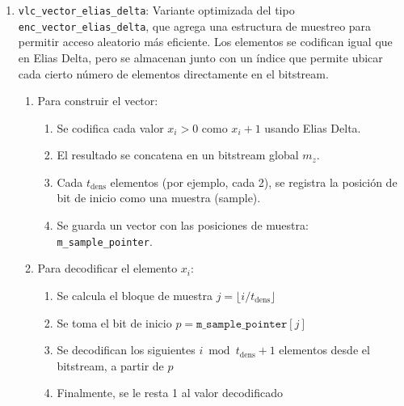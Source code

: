 \begin{enumerate}
        
  \item \texttt{vlc\_vector\_elias\_delta}:  
        Variante optimizada del tipo \texttt{enc\_vector\_elias\_delta}, que agrega una estructura de muestreo para permitir acceso aleatorio más eficiente. Los elementos se codifican igual que en Elias Delta, pero se almacenan junto con un índice que permite ubicar cada cierto número de elementos directamente en el bitstream.
    
        \begin{enumerate}
            \item Para construir el vector:
            \begin{enumerate}
                \item Se codifica cada valor \(x_i > 0\) como \(x_i + 1\) usando Elias Delta.
                \item El resultado se concatena en un bitstream global \(m_z\).
                \item Cada \(t_{\text{dens}}\) elementos (por ejemplo, cada 2), se registra la posición de bit de inicio como una muestra (sample).
                \item Se guarda un vector con las posiciones de muestra: \texttt{m\_sample\_pointer}.
            \end{enumerate}
    
            \item Para decodificar el elemento \(x_i\):
            \begin{enumerate}
                \item Se calcula el bloque de muestra \(j = \lfloor i / t_{\text{dens}} \rfloor\)
                \item Se toma el bit de inicio \(p = \texttt{m\_sample\_pointer}[j]\)
                \item Se decodifican los siguientes \(i \bmod t_{\text{dens}} + 1\) elementos desde el bitstream, a partir de \(p\)
                \item Finalmente, se le resta 1 al valor decodificado
            \end{enumerate}
        \end{enumerate}
    

\end{enumerate}

